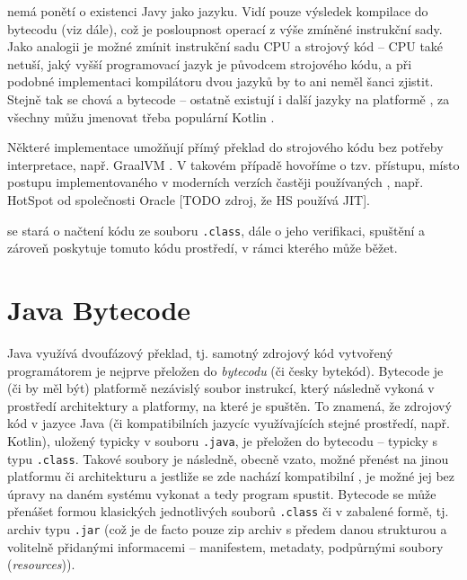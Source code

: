  nemá ponětí o existenci Javy jako jazyku. Vidí pouze výsledek kompilace do bytecodu (viz dále), což je posloupnost operací z výše zmíněné instrukční sady. Jako analogii je možné zmínit instrukční sadu CPU a strojový kód -- CPU také netuší, jaký vyšší programovací jazyk je původcem strojového kódu, a při podobné implementaci kompilátoru dvou jazyků by to ani neměl šanci zjistit. Stejně tak se chová  a bytecode -- ostatně existují i další jazyky na platformě , za všechny můžu jmenovat třeba populární Kotlin \cite{jvms-jvm}.

Některé implementace  umožňují přímý překlad do strojového kódu bez potřeby interpretace, např. GraalVM \cite{graalvm}. V takovém případě hovoříme o tzv.  přístupu, místo  postupu implementovaného v moderních verzích častěji používaných , např. HotSpot od společnosti Oracle [TODO zdroj, že HS používá JIT].

 se stará o načtení kódu ze souboru \texttt{.class}, dále o jeho verifikaci, spuštění a zároveň poskytuje tomuto kódu prostředí, v rámci kterého může běžet.

\section{Java Bytecode}
Java využívá dvoufázový překlad, tj. samotný zdrojový kód vytvořený programátorem je nejprve přeložen do \textit{bytecodu} (či česky bytekód). Bytecode je (či by měl být) platformě nezávislý soubor instrukcí, který následně  vykoná v prostředí architektury a platformy, na které je spuštěn. To znamená, že zdrojový kód v jazyce Java (či kompatibilních jazycíc využívajících stejné prostředí, např. Kotlin), uložený typicky v souboru \texttt{.java}, je přeložen do bytecodu -- typicky s typu \texttt{.class}. Takové soubory je následně, obecně vzato, možné přenést na jinou platformu či architekturu a jestliže se zde nachází kompatibilní , je možné jej bez úpravy na daném systému vykonat a tedy program spustit. Bytecode se může přenášet formou klasických jednotlivých souborů \texttt{.class} či v zabalené formě, tj. archiv typu \texttt{.jar} (což je de facto pouze zip archiv s předem danou strukturou a volitelně přidanými informacemi -- manifestem, metadaty, podpůrnými soubory (\textit{resources})).

